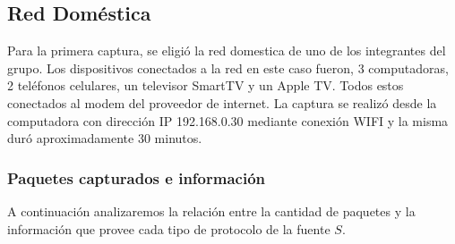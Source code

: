 \subsection{Red Doméstica}

Para la primera captura, se eligió la red domestica de uno de los integrantes del grupo. Los dispositivos conectados a la red en este caso fueron, 3 computadoras, 2 teléfonos celulares, un televisor SmartTV y un Apple TV. Todos estos conectados al modem del proveedor de internet.
La captura se realizó desde la computadora con dirección IP 192.168.0.30 mediante conexión WIFI y la misma duró aproximadamente 30 minutos.

\FloatBarrier

\subsubsection{Paquetes capturados e información}

A continuación analizaremos la relación entre la cantidad de paquetes y la información que provee cada tipo de protocolo de la fuente $S$.

